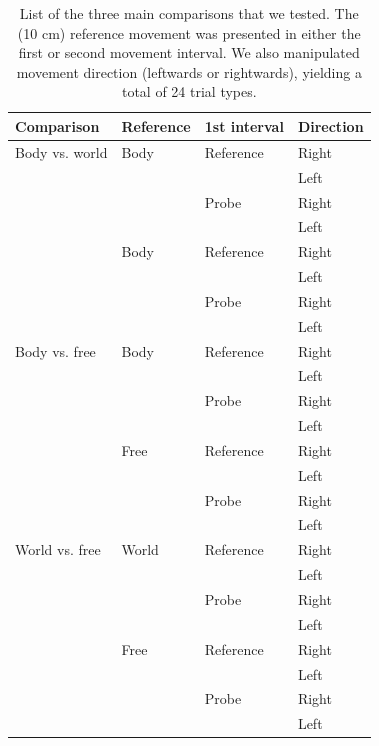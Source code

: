 \begin{table}
    \begin{tabular}{llll}
    Comparison & Reference & 1st interval & Direction \\
    \hline
    Body vs. world & Body & Reference & Right \\
    & & & Left \\
    & & Probe & Right \\
    & & & Left \\
    \cline{2-4}
	& Body & Reference & Right \\
    & & & Left \\
    & & Probe & Right \\
    & & & Left \\
    \hline
    Body vs. free & Body & Reference & Right \\
    & & & Left \\
    & & Probe & Right \\
    & & & Left \\
    \cline{2-4}
	& Free & Reference & Right \\
    & & & Left \\
    & & Probe & Right \\
    & & & Left \\
    \hline
    World vs. free & World & Reference & Right \\
    & & & Left \\
    & & Probe & Right \\
    & & & Left \\
    \cline{2-4}
	& Free & Reference & Right \\
    & & & Left \\
    & & Probe & Right \\
    & & & Left \\
    \end{tabular}

    \caption{List of the three main comparisons that we tested. The (10 \si{\centi\metre}) reference movement was presented in either the first or second movement interval. We also manipulated movement direction (leftwards or rightwards), yielding a total of 24 trial types.}

    \label{p3:tab1}
\end{table}


